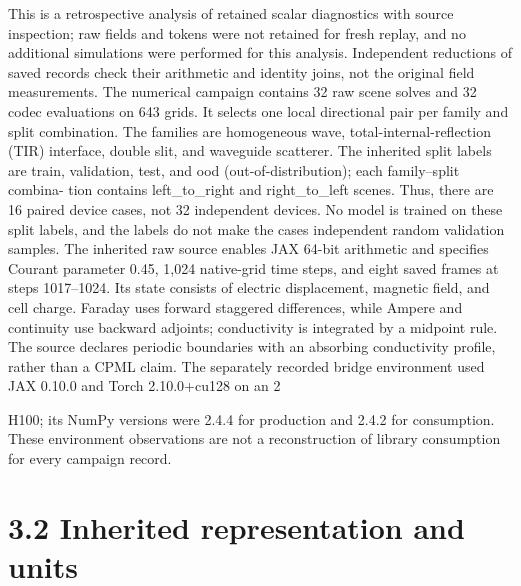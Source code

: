 \documentclass[11pt]{article}
\begin{document}
This is a retrospective analysis of retained scalar diagnostics with source inspection; raw fields and
tokens were not retained for fresh replay, and no additional simulations were performed for this
analysis. Independent reductions of saved records check their arithmetic and identity joins, not the
original field measurements.
The numerical campaign contains 32 raw scene solves and 32 codec evaluations on 643 grids. It
selects one local directional pair per family and split combination. The families are homogeneous
wave, total-internal-reflection (TIR) interface, double slit, and waveguide scatterer. The inherited
split labels are train, validation, test, and ood (out-of-distribution); each family–split combina-
tion contains left\_to\_right and right\_to\_left scenes. Thus, there are 16 paired device cases,
not 32 independent devices. No model is trained on these split labels, and the labels do not make
the cases independent random validation samples.
The inherited raw source enables JAX 64-bit arithmetic and specifies Courant parameter 0.45,
1,024 native-grid time steps, and eight saved frames at steps 1017–1024. Its state consists of electric
displacement, magnetic field, and cell charge. Faraday uses forward staggered differences, while
Ampere and continuity use backward adjoints; conductivity is integrated by a midpoint rule. The
source declares periodic boundaries with an absorbing conductivity profile, rather than a CPML
claim. The separately recorded bridge environment used JAX 0.10.0 and Torch 2.10.0+cu128 on an
2

H100; its NumPy versions were 2.4.4 for production and 2.4.2 for consumption. These environment
observations are not a reconstruction of library consumption for every campaign record.

\section*{3.2 Inherited representation and units}
\end{document}
